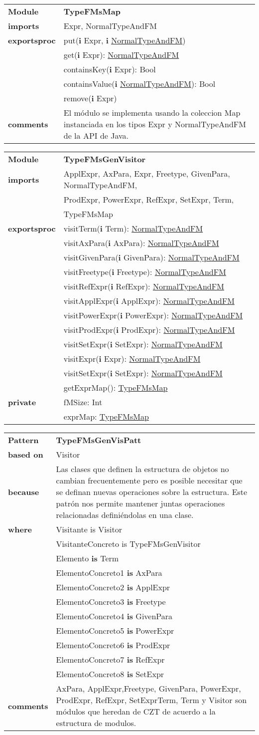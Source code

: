 \documentclass[12pt,a4paper,fleqn]{report}
\newenvironment{module}[1]{\hypertarget{mi:#1}{} \vspace{0.5cm}\noindent\begin{tabular}{|p{0.2\textwidth} p{0.75\textwidth}|} \hline{\bf Module} & {\bf #1} \\}{\hline\end{tabular}\vspace{0.5cm}}
\newcommand{\eproc}{{\bf exportsproc}}
\newcommand{\priv}{{\bf private}}
\newcommand{\proc}[1]{& #1 \\}
\newcommand{\e}[1]{{\bf i} \hyperlink{mi:#1}{#1}}
\newcommand{\eb}[1]{{\bf i} #1}
\newcommand{\imp}[1]{{\bf imports} & #1 \\}
\newcommand{\comm}[1]{{\bf comments} & #1 \\}
\newcommand{\mdr}[1]{\hyperlink{mi:#1}{#1}}
\newcommand{\extraline}[1]{& #1 \\}
\newenvironment{pattern}[1]{\vspace{0.5cm}\noindent\begin{tabular}{|p{0.2\textwidth} p{0.70\textwidth}|} \hline{\bf Pattern} & {\bf #1} \\}{\hline\end{tabular}\vspace{0.5cm}}
\newcommand{\based}[1]{{\bf based on} & #1 \\}
\newcommand{\bec}[1]{{\bf because} & #1 \\}
\newcommand{\pwhere}{{\bf where}}
\newcommand{\is}{{\bf is} }
\begin{document}
\begin{module}{TypeFMsMap}
\imp{Expr, NormalTypeAndFM}
\eproc
\proc{put(\eb {Expr}, \e {NormalTypeAndFM})}
\proc{get(\eb {Expr}): \mdr{NormalTypeAndFM}}
\proc{containsKey(\eb {Expr}): Bool}
\proc{containsValue(\e {NormalTypeAndFM}): Bool}
\proc{remove(\eb {Expr})}
\comm{El módulo se implementa usando la coleccion Map instanciada en los tipos Expr y NormalTypeAndFM de la API de Java.}
\end{module}



\begin{module}{TypeFMsGenVisitor}
\imp{ApplExpr, AxPara, Expr, Freetype, GivenPara, NormalTypeAndFM, }
\extraline{ProdExpr, PowerExpr, RefExpr, SetExpr, Term,}
\extraline{TypeFMsMap}
\eproc
\proc{visitTerm(\eb {Term}): \mdr{NormalTypeAndFM}}
\proc{visitAxPara(\eb {AxPara}): \mdr{NormalTypeAndFM}}
\proc{visitGivenPara(\eb {GivenPara}): \mdr{NormalTypeAndFM}}
\proc{visitFreetype(\eb {Freetype}): \mdr{NormalTypeAndFM}}
\proc{visitRefExpr(\eb {RefExpr}): \mdr{NormalTypeAndFM}}
\proc{visitApplExpr(\eb {ApplExpr}): \mdr{NormalTypeAndFM}}
\proc{visitPowerExpr(\eb {PowerExpr}): \mdr{NormalTypeAndFM}}
\proc{visitProdExpr(\eb {ProdExpr}): \mdr{NormalTypeAndFM}}
\proc{visitSetExpr(\eb {SetExpr}): \mdr{NormalTypeAndFM}}
\proc{visitExpr(\eb {Expr}): \mdr{NormalTypeAndFM}}
\proc{visitSetExpr(\eb {SetExpr}): \mdr{NormalTypeAndFM}}
\proc{getExprMap(): \mdr{TypeFMsMap}}
\priv
\proc{fMSize: Int}
\proc{exprMap: \mdr{TypeFMsMap}}
\end{module}



\begin{pattern}{TypeFMsGenVisPatt}
\based{Visitor}
\bec{Las clases que definen la estructura de objetos no cambian frecuentemente pero es posible necesitar que se definan nuevas operaciones sobre la estructura. Este patrón nos permite mantener juntas operaciones relacionadas definiéndolas en una clase.}
\pwhere
\proc{Visitante is Visitor}
\proc{VisitanteConcreto is TypeFMsGenVisitor}
\proc{Elemento \is Term}
\proc{ElementoConcreto1 \is AxPara}
\proc{ElementoConcreto2 \is ApplExpr}
\proc{ElementoConcreto3 \is Freetype}
\proc{ElementoConcreto4 \is GivenPara}
\proc{ElementoConcreto5 \is PowerExpr}
\proc{ElementoConcreto6 \is ProdExpr}
\proc{ElementoConcreto7 \is RefExpr}
\proc{ElementoConcreto8 \is SetExpr}
\comm{AxPara, ApplExpr,Freetype, GivenPara, PowerExpr, ProdExpr, RefExpr, SetExprTerm, Term y Visitor son módulos que heredan de CZT de acuerdo a la estructura de modulos.}
\end{pattern}
\end{document}
